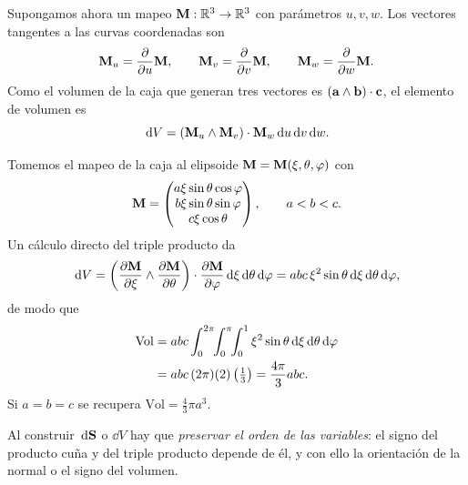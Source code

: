 Supongamos ahora un mapeo $\mathbf{M}:\mathbb{R}^3\rightarrow\mathbb{R}^3$ con par\'ametros
$u,v,w$. Los vectores tangentes a las curvas coordenadas son
\begin{equation}
  \label{eq:tangentes_volumen}
  \mathbf{M}_u=\frac{\partial }{\partial u}\mathbf{M},
  \qquad
  \mathbf{M}_v=\frac{\partial }{\partial v}\mathbf{M},
  \qquad
  \mathbf{M}_w=\frac{\partial }{\partial w}\mathbf{M} .
\end{equation}
Como el volumen de la caja que generan tres vectores es
$(\mathbf{a}\wedge\mathbf{b})\cdot\mathbf{c}$, el elemento de volumen es
\begin{equation}
  \label{eq:dV}
  \,\mathrm{d} V=\left( \mathbf{M}_u\wedge\mathbf{M}_v \right)\cdot\mathbf{M}_w
    \,\mathrm{d} u\,\mathrm{d} v\,\mathrm{d} w .
\end{equation}

\begin{ejemplo}
  \label{ej:volumen_elipsoide}
  Tomemos el mapeo de la caja al elipsoide
  $\mathbf{M}=\mathbf{M}(\xi,\theta,\varphi)$ con
  \begin{equation}
    \label{eq:mapeo_elipsoide}
    \mathbf{M}=
    \begin{pmatrix}
      a\xi\sin\theta\cos\varphi\\
      b\xi\sin\theta\sin\varphi\\
      c\xi\cos\theta
    \end{pmatrix},
    \qquad a<b<c .
  \end{equation}
  Un c\'alculo directo del triple producto da
  \begin{equation}
    \label{eq:dV_elipsoide}
    \,\mathrm{d} V=\left( \frac{\partial \mathbf{M}}{\partial \xi}\wedge\frac{\partial \mathbf{M}}{\partial \theta} \right)
      \cdot\frac{\partial \mathbf{M}}{\partial \varphi}\,\mathrm{d}\xi\,\mathrm{d}\theta\,\mathrm{d}\varphi
      =abc\,\xi^2\sin\theta\,\mathrm{d}\xi\,\mathrm{d}\theta\,\mathrm{d}\varphi ,
  \end{equation}
  de modo que
  \begin{equation}
    \label{eq:volumen_elipsoide}
    \begin{aligned}
      \mathrm{Vol}&=abc\int_{0}^{2\pi}\!\!\int_{0}^{\pi}\!\!\int_{0}^{1}
        \xi^2\sin\theta\,\mathrm{d}\xi\,\mathrm{d}\theta\,\mathrm{d}\varphi\\
        &=abc\,(2\pi)(2)\left( \tfrac{1}{3} \right)=\frac{4\pi}{3}abc .
    \end{aligned}
  \end{equation}
  Si $a=b=c$ se recupera $\mathrm{Vol}=\tfrac{4}{3}\pi a^3$.
\end{ejemplo}

\begin{observacion}
  Al construir $\,\mathrm{d}\mathbf{S}$ o $\dd V$ hay que \emph{preservar el orden de las
  variables}: el signo del producto cu\~na y del triple producto depende de
  \'el, y con ello la orientaci\'on de la normal o el signo del volumen.
\end{observacion}
